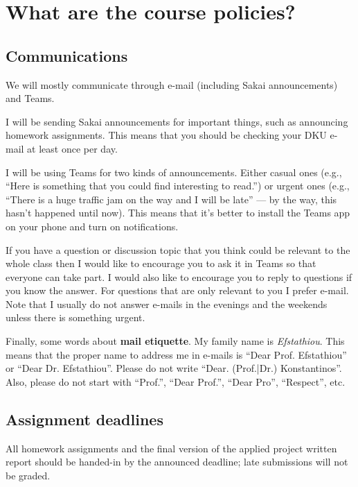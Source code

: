 \documentclass[11pt]{article}
\begin{document}

\section{What are the course policies?}

\subsection{Communications}

We will mostly communicate through e-mail (including Sakai announcements) and Teams.

I will be sending Sakai announcements for important things, such as announcing homework assignments. This means that you should be checking your DKU e-mail at least once per day.

I will be using Teams for two kinds of announcements. Either casual ones (e.g., ``Here is something that you could find interesting to read.'') or urgent ones (e.g., ``There is a huge traffic jam on the way and I will be late'' --- by the way, this hasn't happened until now). This means that it's better to install the Teams app on your phone and turn on notifications.

If you have a question or discussion topic that you think could be relevant to the whole class then I would like to encourage you to ask it in Teams so that everyone can take part.
I would also like to encourage you to reply to questions if you know the answer.
For questions that are only relevant to you I prefer e-mail. 
Note that I usually do not answer e-mails in the evenings and the weekends unless there is something urgent.

Finally, some words about \textbf{mail etiquette}. My family name is \textit{Efstathiou}. This means that the proper name to address me in e-mails is ``Dear Prof. Efstathiou'' or ``Dear Dr. Efstathiou''. Please do not write ``Dear. (Prof.|Dr.) Konstantinos''. Also, please do not start with ``Prof.'', ``Dear Prof.'', ``Dear Pro'', ``Respect'', etc.



\subsection{Assignment deadlines}

All homework assignments and the final version of the applied project written report should be handed-in by the announced deadline; late submissions will not be graded. 
\end{document}
